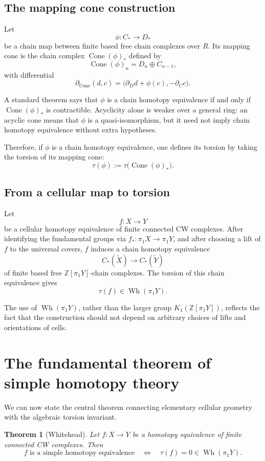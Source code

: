 \documentclass[11pt,a4paper]{article}
\newcommand{\Wh}{\operatorname{Wh}}
\newcommand{\Cone}{\operatorname{Cone}}
\newcommand{\ZZ}{\mathbb{Z}}
\theoremstyle{definition}
\theoremstyle{plain}
\newtheorem{theorem}[definition]{Theorem}
\theoremstyle{remark}
\begin{document}
\subsection{The mapping cone construction}

Let
\[
  \phi:C_*\longrightarrow D_*
\]
be a chain map between finite based free chain complexes over \(R\). Its mapping cone is the chain complex \(\Cone(\phi)_*\) defined by
\[
  \Cone(\phi)_n=D_n\oplus C_{n-1},
\]
with differential
\[
  \partial_{\Cone}(d,c)=\bigl(\partial_D d+\phi(c),-\partial_C c\bigr).
\]

A standard theorem says that \(\phi\) is a chain homotopy equivalence if and only if \(\Cone(\phi)_*\) is contractible. Acyclicity alone is weaker over a general ring: an acyclic cone means that \(\phi\) is a quasi-isomorphism, but it need not imply chain homotopy equivalence without extra hypotheses.

Therefore, if \(\phi\) is a chain homotopy equivalence, one defines its torsion by taking the torsion of its mapping cone:
\[
  \tau(\phi):=\tau\bigl(\Cone(\phi)_*\bigr).
\]

\subsection{From a cellular map to torsion}

Let
\[
  f:X\longrightarrow Y
\]
be a cellular homotopy equivalence of finite connected CW complexes. After identifying the fundamental groups via \(f_*:\pi_1X\to\pi_1Y\), and after choosing a lift of \(f\) to the universal covers, \(f\) induces a chain homotopy equivalence
\[
  C_*(\widetilde X)\longrightarrow C_*(\widetilde Y)
\]
of finite based free \(\ZZ[\pi_1Y]\)-chain complexes. The torsion of this chain equivalence gives
\[
  \tau(f)\in \Wh(\pi_1Y).
\]

The use of \(\Wh(\pi_1Y)\), rather than the larger group \(K_1(\ZZ[\pi_1Y])\), reflects the fact that the construction should not depend on arbitrary choices of lifts and orientations of cells.

\section{The fundamental theorem of simple homotopy theory}

We can now state the central theorem connecting elementary cellular geometry with the algebraic torsion invariant.

\begin{theorem}[Whitehead]
Let \(f:X\to Y\) be a homotopy equivalence of finite connected CW complexes. Then
\[
  f \text{ is a simple homotopy equivalence}
  \quad\Longleftrightarrow\quad
  \tau(f)=0\in \Wh(\pi_1Y).
\]
\end{theorem}
\end{document}
